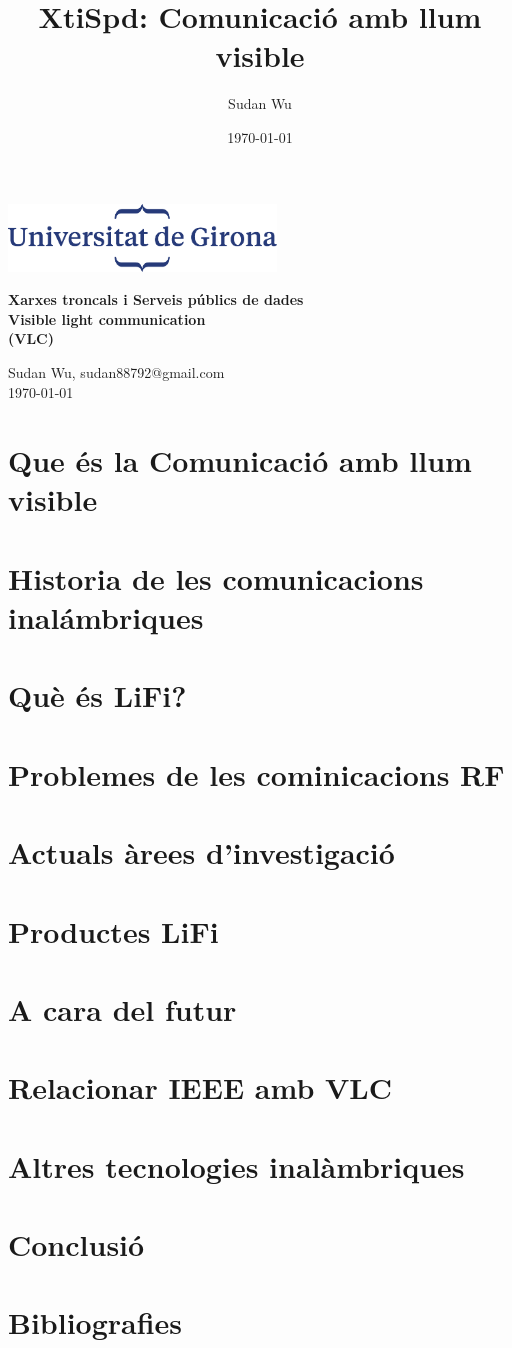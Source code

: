 \documentclass[10pt,a4paper]{article}
\title{XtiSpd: Comunicació amb llum visible}
\author{Sudan Wu}
\date{\today}
\begin{document}
\begin{titlepage}
    \begin{center}
        \includegraphics[height=1.8cm]{logoUdG}\\\vfill
    \end{center}
    \center
    {\huge \bfseries Xarxes troncals i Serveis públics de dades}\\[0.5cm]
    {\Huge \bfseries Visible light communication} \\[0.5cm]
    {\Huge \bfseries (VLC)} \\[0.5cm]

    \vfill
    \begin{center} \large
        {Sudan Wu, sudan88792@gmail.com} \\[0.25cm]
        {\today}\\ [1cm]
    \end{center}

\end{titlepage}

\tableofcontents

\clearpage

\section{Que és la Comunicació amb llum visible}


\section{Historia de les comunicacions inalámbriques}
\section{Què és LiFi?}

\section{Problemes de les cominicacions RF}
\section{Actuals àrees d'investigació}
\section{Productes LiFi}
\section{A cara del futur}
\section{Relacionar IEEE amb VLC}
\section{Altres tecnologies inalàmbriques}
\section{Conclusió}
\section{Bibliografies}

\end{document}
